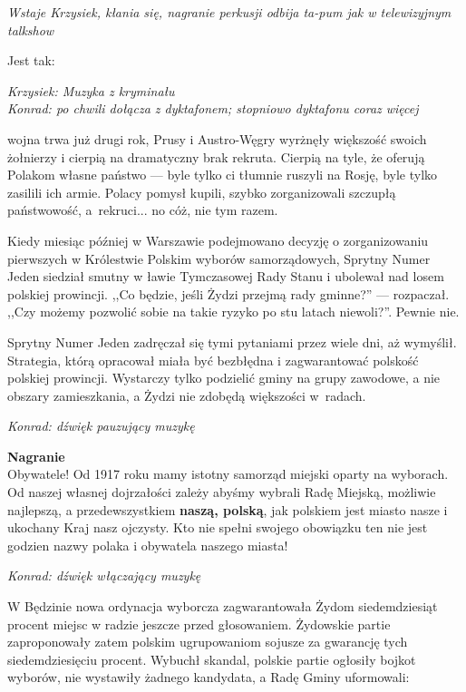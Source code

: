 \documentclass[11pt,a4paper,oneside]{article}
\begin{document}
{\color{light-gray} \emph{Wstaje Krzysiek, kłania się, nagranie perkusji odbija
ta-pum jak w telewizyjnym talkshow}}

Jest tak: 

{\color{krzysiek} \emph{Krzysiek: Muzyka z kryminału}}\\
{\color{konrad} \emph{Konrad: po chwili dołącza z dyktafonem; stopniowo
dyktafonu coraz więcej}}

wojna trwa już drugi rok, Prusy i Austro-Węgry wyrżnęły większość
swoich żołnierzy i cierpią na dramatyczny brak rekruta. Cierpią na
tyle, że oferują Polakom własne państwo --- byle tylko ci tłumnie
ruszyli na Rosję, byle tylko zasilili ich armie. Polacy pomysł kupili,
szybko zorganizowali szczupłą państwowość, a~rekruci... no cóż, nie
tym razem.

Kiedy miesiąc później w Warszawie podejmowano decyzję o zorganizowaniu
pierwszych w Królestwie Polskim wyborów samorządowych, Sprytny Numer
Jeden siedział smutny w ławie Tymczasowej Rady Stanu i ubolewał nad
losem polskiej prowincji. ,,Co będzie, jeśli Żydzi przejmą rady
gminne?'' --- rozpaczał.  ,,Czy możemy pozwolić sobie na takie ryzyko
po stu latach niewoli?''. Pewnie nie.

Sprytny Numer Jeden zadręczał się tymi pytaniami przez wiele dni, aż
wymyślił.  Strategia, którą opracował miała być bezbłędna
i zagwarantować polskość polskiej prowincji. Wystarczy tylko podzielić
gminy na grupy zawodowe, a nie obszary zamieszkania, a Żydzi nie %
zdobędą większości w~radach.

{\color{konrad} \emph{Konrad: dźwięk pauzujący muzykę}}

\textbf{Nagranie}\\
Obywatele! Od 1917 roku mamy istotny samorząd miejski oparty na
wyborach. Od naszej własnej dojrzałości zależy abyśmy wybrali Radę
Miejską, możliwie najlepszą, a przedewszystkiem \textbf{naszą,
polską}, jak polskiem jest miasto nasze i ukochany Kraj nasz ojczysty.
Kto nie spełni swojego obowiązku ten nie jest godzien nazwy polaka
i obywatela naszego miasta!

{\color{konrad} \emph{Konrad: dźwięk włączający muzykę}}

W Będzinie nowa ordynacja wyborcza zagwarantowała Żydom siedemdziesiąt
procent miejsc w radzie jeszcze przed głosowaniem. Żydowskie partie %
zaproponowały zatem polskim ugrupowaniom sojusze za gwarancję tych
siedemdziesięciu procent. Wybuchł skandal, polskie partie ogłosiły
bojkot wyborów, nie wystawiły żadnego kandydata, a Radę Gminy uformowali:
\end{document}
